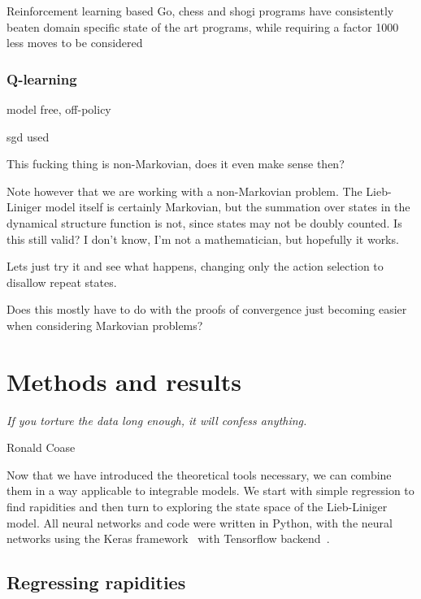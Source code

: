 \documentclass[11pt, a4paper]{report} %
\begin{document}
Reinforcement learning based Go, chess and shogi programs have consistently beaten domain specific state of the art programs, while requiring a factor 1000 less moves to be considered~\cite{Silver2017}



\subsection{Q-learning}

model free, off-policy

sgd used~\cite{mnih13_playin_atari_with_deep_reinf_learn}


This fucking thing is non-Markovian, does it even make sense then?

Note however that we are working with a non-Markovian problem.
The Lieb-Liniger model itself is certainly Markovian, but the summation over states in the dynamical structure function is not, since states may not be doubly counted.
Is this still valid?
I don't know, I'm not a mathematician, but hopefully it works.

Lets just try it and see what happens, changing only the action selection to disallow repeat states.

Does this mostly have to do with the proofs of convergence just becoming easier when considering Markovian problems?


\cite{Sutton}



\chapter{Methods and results}\label{chap:results}

\epigraph{\textit{If you torture the data long enough, it will confess anything.}}{Ronald Coase}

Now that we have introduced the theoretical tools necessary, we can combine them in a way applicable to integrable models.
We start with simple regression to find rapidities and then turn to exploring the state space of the Lieb-Liniger model.
All neural networks and code were written in Python, with the neural networks using the Keras framework~\cite{chollet2015keras} with Tensorflow backend~\cite{tensorflow2015-whitepaper}.

\section{Regressing rapidities}
\end{document}

